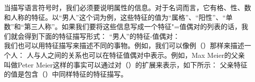 当描写语言符号时，我们必须要说明属性的信息。对于名词而言，它有格、性、数和人称的特征。以“男人”这个词为例，这些特征的值为“属格”、“阳性”、“单数”和“第三人称”。如果我们要将这些信息写成一个特征"=值偶对的列表的话，我们就会得到下面的特征描写形式：
\eas
“男人”的特征-值偶对：\\
\zs
我们也可以用特征描写来描述不同的事物。例如，我们可以像例（）那样来描述一个人：
\ea
{}
\z
人与人之间的关系也可以在特征值偶对中表示。例如，Max Meier的父亲叫做Peter Meier这样的事实可以通过对（）的扩展来表示，如下所示：
\ea
{}
\z
\textsc{父亲}特征的值是包含（）中同样特征的特征描写。

